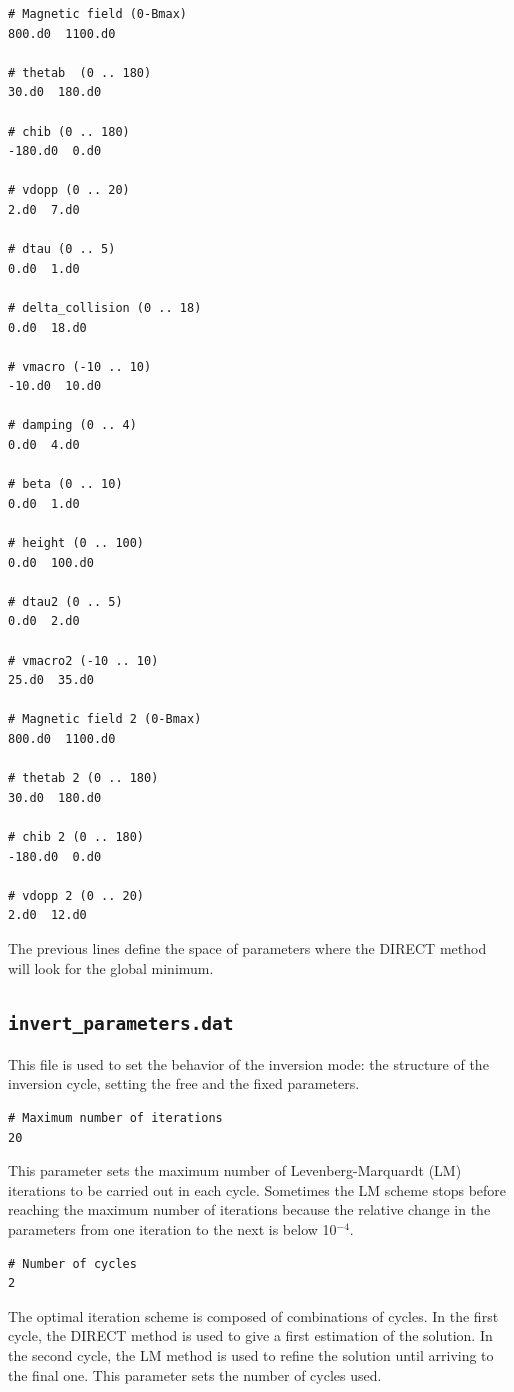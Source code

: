 \documentclass[12pt]{article}
\begin{document}
\begin{verbatim}
# Magnetic field (0-Bmax)
800.d0  1100.d0

# thetab  (0 .. 180)
30.d0  180.d0

# chib (0 .. 180)
-180.d0  0.d0

# vdopp (0 .. 20)
2.d0  7.d0

# dtau (0 .. 5)
0.d0  1.d0

# delta_collision (0 .. 18)
0.d0  18.d0

# vmacro (-10 .. 10)
-10.d0  10.d0

# damping (0 .. 4)
0.d0  4.d0

# beta (0 .. 10)
0.d0  1.d0

# height (0 .. 100)
0.d0  100.d0

# dtau2 (0 .. 5)
0.d0  2.d0

# vmacro2 (-10 .. 10)
25.d0  35.d0

# Magnetic field 2 (0-Bmax)
800.d0  1100.d0

# thetab 2 (0 .. 180)
30.d0  180.d0

# chib 2 (0 .. 180)
-180.d0  0.d0

# vdopp 2 (0 .. 20)
2.d0  12.d0
\end{verbatim}
The previous lines define the space of parameters where the DIRECT method will look for the
global minimum.


\subsection{\texttt{invert\_parameters.dat}}
\label{sec:invert_parameters}
This file is used to set the behavior of the inversion mode: the structure of the inversion cycle,
setting the free and the fixed parameters.

\begin{verbatim}
# Maximum number of iterations
20
\end{verbatim}
This parameter sets the maximum number of Levenberg-Marquardt (LM) iterations to be carried out
in each cycle. Sometimes the LM scheme stops before reaching the maximum number of iterations
because the relative change in the parameters from one iteration to the next is below 10$^{-4}$.

\begin{verbatim}
# Number of cycles
2
\end{verbatim}
The optimal iteration scheme is composed of combinations of cycles. In the first cycle, the DIRECT method
is used to give a first estimation of the solution. In the second cycle, the LM method is used to refine
the solution until arriving to the final one. This parameter sets the number of cycles used.
\end{document}
